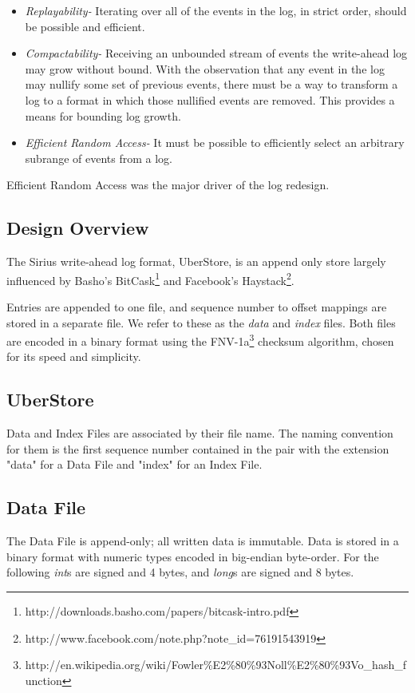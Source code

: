 \documentclass[11pt]{article}
\begin{document}
\begin{itemize}
\item {\em Replayability-} 
    Iterating over all of the events in the log, in strict order, 
    should be possible and efficient.
\item {\em Compactability-}
    Receiving an unbounded stream of events the write-ahead log
    may grow without bound. With the observation that any event
    in the log may nullify some set of previous events, there must
    be a way to transform a log to a format in which those nullified
    events are removed. This provides a means for bounding log growth.
\item {\em Efficient Random Access-}
    It must be possible to efficiently select an arbitrary subrange of
    events from a log.
\end{itemize}

Efficient Random Access was the major driver of the log redesign.


\subsection{Design Overview}
The Sirius write-ahead log format, UberStore, is an append only store largely influenced
by Basho's BitCask\footnote{http://downloads.basho.com/papers/bitcask-intro.pdf} and
Facebook's Haystack\footnote{http://www.facebook.com/note.php?note\_id=76191543919}.

Entries are appended to one file, and sequence number to offset mappings are stored
in a separate file. We refer to these as the {\em data} and {\em index} files. Both files
are encoded in a binary format using the FNV-1a\footnote{http://en.wikipedia.org/wiki/Fowler\%E2\%80\%93Noll\%E2\%80\%93Vo\_hash\_function}
checksum algorithm, chosen for its speed and simplicity.

\subsection{UberStore}
Data and Index Files are associated by their file name.  The naming convention for them
is the first sequence number contained in the pair with the extension "data" for a
Data File and "index" for an Index File.

\subsection{Data File}
The Data File is append-only; all written data is immutable.  Data is stored in a binary
format with numeric types encoded in big-endian byte-order. For the following {\em int}s
are signed and 4 bytes, and {\em long}s are signed and 8 bytes.
\end{document}
